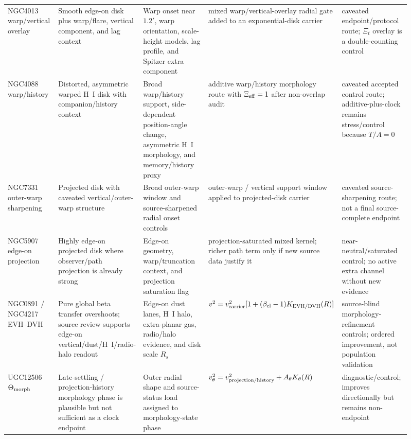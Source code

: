 \documentclass[11pt]{article}
\begin{document}
\begin{landscape}
\begin{longtable}{@{}p{0.13\linewidth}p{0.18\linewidth}p{0.19\linewidth}p{0.23\linewidth}p{0.18\linewidth}@{}}
NGC4013 warp/vertical overlay &
Smooth edge-on disk plus warp/flare, vertical component, and lag context &
Warp onset near \(1.2'\), warp orientation, scale-height models, lag profile,
and Spitzer extra component &
mixed warp/vertical-overlay radial gate added to an exponential-disk carrier &
caveated endpoint/protocol route; \(\Xi_t\) overlay is a double-counting control \\

NGC4088 warp/history &
Distorted, asymmetric warped H~I disk with companion/history context &
Broad warp/history support, side-dependent position-angle change, asymmetric
H~I morphology, and memory/history proxy &
additive warp/history morphology route with \(\Xi_{\rm eff}=1\) after
non-overlap audit &
caveated accepted control route; additive-plus-clock remains stress/control
because \(T/A=0\) \\

NGC7331 outer-warp sharpening &
Projected disk with caveated vertical/outer-warp structure &
Broad outer-warp window and source-sharpened radial onset controls &
outer-warp / vertical support window applied to projected-disk carrier &
caveated source-sharpening route; not a final source-complete endpoint \\

NGC5907 edge-on projection &
Highly edge-on projected disk where observer/path projection is already strong &
Edge-on geometry, warp/truncation context, and projection saturation flag &
projection-saturated mixed kernel; richer path term only if new source data
justify it &
near-neutral/saturated control; no active extra channel without new evidence \\

NGC0891 / NGC4217 EVH--DVH &
Pure global beta transfer overshoots; source review supports edge-on
vertical/dust/H~I/radio-halo readout &
Edge-on dust lanes, H~I halo, extra-planar gas, radio/halo evidence, and disk
scale \(R_s\) &
\(v^2=v_{\rm carrier}^2[1+(\beta_{\rm cl}-1)K_{\rm EVH/DVH}(R)]\) &
source-blind morphology-refinement controls; ordered improvement, not
population validation \\

UGC12506 \(\Theta_{\rm morph}\) &
Late-settling / projection-history morphology phase is plausible but not
sufficient as a clock endpoint &
Outer radial shape and source-status load assigned to morphology-state phase &
\(v_\theta^2=v_{\rm projection/history}^2+A_\theta K_\theta(R)\) &
diagnostic/control; improves directionally but remains non-endpoint \\


\end{longtable}
\end{landscape}
\end{document}
